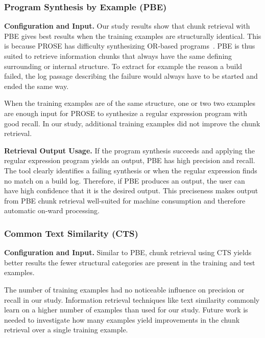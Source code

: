 \subsubsection{Program Synthesis by Example (PBE)}

\noindent
\textbf{Configuration and Input.}
Our study results show that chunk retrieval with PBE gives best
results when the training examples are structurally identical.
This is
because PROSE has difficulty synthesizing OR-based
programs~\cite{mayer2015user}.
PBE is thus suited to retrieve information
chunks that always have the same defining surrounding or internal
structure.
To extract for example the reason a build failed, the log
passage describing the failure would always have to be started and
ended the same way.

When the training examples are of the same structure, one or two
two examples are enough input for PROSE to synthesize a regular
expression program with good recall.
In our study, additional training
examples did not improve the chunk retrieval.

\noindent
\textbf{Retrieval Output Usage.}
If the program synthesis succeeds and applying the regular expression
program yields an output, PBE has high precision and recall.
The tool
clearly identifies a failing synthesis or when the regular expression
finds no match on a build log.
Therefore, if PBE produces
an output, the user can have high confidence that it is the desired
output.
This preciseness makes output from PBE chunk retrieval
well-suited for machine consumption and therefore automatic on-ward
processing.

\subsubsection{Common Text Similarity (CTS)}
\noindent
\textbf{Configuration and Input.}
Similar to PBE, chunk retrieval using CTS yields better results the
fewer structural categories are present in the training and test
examples.

The number of training examples had no noticeable influence on
precision or recall in our study.
Information retrieval techniques
like text similarity commonly learn on a higher number of examples
than used for our study.
Future work is needed to investigate how many
examples yield improvements in the chunk retrieval over a single
training example.

